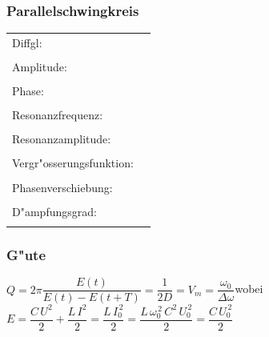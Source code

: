 \subsubsection{Parallelschwingkreis}
\begin{tabular}{|p{4cm}|p{14cm}|}
\hline
Diffgl: &
\begin{minipage}[]{14cm}
\vspace{0.2cm}
$C\ddot{U}+\dfrac{1}{R_P}\dot{U}+\dfrac{1}{L}U=\omega\,I_0\,\sin(\omega
t+\dfrac{\pi}{2})$\\
\end{minipage}\\
\hline
Amplitude: &
\begin{minipage}[]{14cm}
\vspace{0.2cm}
$U_0=\dfrac{\omega\,I_0}{C\sqrt{(\omega_0^{\,2}-\omega^2)^2+(2D\,\omega_0\,\omega)^2}}$\\
\end{minipage}\\
\hline
Phase: &
\begin{minipage}[]{14cm}
\vspace{0.2cm}
$\varphi=\arctan{\dfrac{2D\,\omega_0\,\omega}{\omega_0^{\,2}-\omega^2}}-\dfrac{\pi}{2}$\\
\end{minipage}\\
\hline
Resonanzfrequenz: &
\begin{minipage}[]{14cm}
\vspace{0.2cm}
$\omega_r=\omega_0=\dfrac{1}{\sqrt{LC}}$\\
\end{minipage}\\
\hline
Resonanzamplitude: &
\begin{minipage}[]{14cm}
\vspace{0.2cm}
$U_{0_r}=I_0\cdot R_P=\dfrac{\omega^2\,L^2}{R_S}$\\
\end{minipage}\\
\hline
Vergr"osserungsfunktion: &
\begin{minipage}[]{14cm}
\vspace{0.2cm}
$V(\eta)=\dfrac{1}{\sqrt{(1-\eta^2)^2+(2D\,\eta)^2}}$\qquad Max:
$V_m=\dfrac{1}{2D\sqrt{1-D^2}}$\\
\end{minipage}\\
\hline
Phasenverschiebung: &
\begin{minipage}[]{14cm}
\vspace{0.2cm}
$\varphi_I=\arctan\left(\dfrac{2D\,\eta}{1-\eta^2}\right)$\\
\end{minipage}\\
\hline
D"ampfungsgrad: &
\begin{minipage}[]{14cm}
\vspace{0.2cm}
$D=\dfrac{1}{2\,R_P}\sqrt{\dfrac{L}{C}}$\\
\end{minipage}\\
\hline
\end{tabular}
\renewcommand{\arraystretch}{1}

\subsubsection{G"ute}
$Q=2\pi\dfrac{E(t)}{E(t)-E(t+T)}=\dfrac{1}{2D}=V_m=\dfrac{\omega_0}{\Delta \omega}$\quad wobei \quad $E=\dfrac{C\,U^2}{2}+\dfrac{L\,I^2}{2}=\dfrac{L\,I_0^{\,2}}{2}=\dfrac{L\,\omega_0^{\,2}\,C^2\,U_0^{\,2}}{2}=\dfrac{C\,U_0^{\,2}}{2}$
